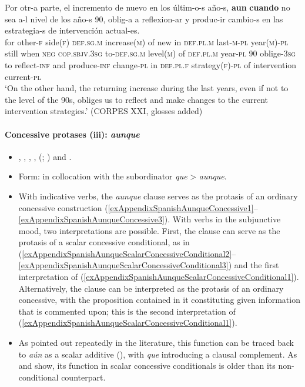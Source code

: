 \begin{exe}
	\ex\label{exAppendixSpanishAunAunCuando4}
	\gll Por otr-a parte, el incremento de nuevo en los últim-o-s año-s, \textbf{aun} \textbf{cuando} no sea a-l nivel de los año-s 90, oblig-a a reflexion-ar y produc-ir cambio-s en las estrategia-s de intervención actual-es.\\
	for other-\textsc{f} side(\textsc{f}) \textsc{def}.\textsc{sg}.\textsc{m} increase(\textsc{m}) of new in \textsc{def}.\textsc{pl}.\textsc{m} last-\textsc{m}-\textsc{pl} year(\textsc{m})-\textsc{pl} still when \textsc{neg} \textsc{cop}.\textsc{sbjv}.3\textsc{sg} to-\textsc{def}.\textsc{sg}.\textsc{m} level(\textsc{m}) of \textsc{def}.\textsc{pl}.\textsc{m} year-\textsc{pl} 90 oblige-3\textsc{sg} to reflect-\textsc{inf} and produce-\textsc{inf} change-\textsc{pl} in \textsc{def}.\textsc{pl}.\textsc{f} strategy(\textsc{f})-\textsc{pl} of intervention current-\textsc{pl}\\
	\glt \lq On the other hand, the returning increase during the last years, even if not to the level of the 90s, obliges us to reflect and make changes to the current intervention strategies.' (CORPES XXI, glosses added)
\end{exe}

\paragraph{Concessive protases (iii): \textit{aunque}}
\label{appendixSpanishAunque}
\begin{itemize}
	\item \textcite{Cid1999}, \textcite{Elvira2005}, \textcite{FlamencoGarcia1999}, \textcite{PerezSaldanyaVincent2014}, \citeauthor{RAEGramatica} (\citeyear[§§47.2,  47.12–47.13]{RAEGramatica}; \citeyear[s.v. \textit{aunque}]{RAEDictionary}) and \textcite{Trujillo1990}.
	\item Form: in collocation with the subordinator \textit{que} > \textit{aunque}.
	\item With indicative verbs, the \textit{aunque} clause serves as the protasis of an ordinary concessive construction (\ref{exAppendixSpanishAunqueConcessive1}–\ref{exAppendixSpanishAunqueConcessive3}). With verbs in the subjunctive mood, two interpretations are possible. First, the clause can serve as the protasis of a scalar concessive conditional, as in (\ref{exAppendixSpanishAunqueScalarConcessiveConditional2}– \ref{exAppendixSpanishAunqueScalarConcessiveConditional3}) and the first interpretation of (\ref{exAppendixSpanishAunqueScalarConcessiveConditional1}). Alternatively, the clause can be interpreted as the protasis of an ordinary concessive, with the proposition contained in it constituting given information that is commented upon; this is the second interpretation of (\ref{exAppendixSpanishAunqueScalarConcessiveConditional1}).
	\item As pointed out repeatedly in the literature, this function can be traced back to \textit{aún} as a scalar additive (), with \textit{que} introducing a clausal complement. As \textcite{Elvira2005} and \textcite{PerezSaldanyaVincent2014} show, its function in scalar concessive conditionals is older than its non-conditional counterpart.
\end{itemize}

